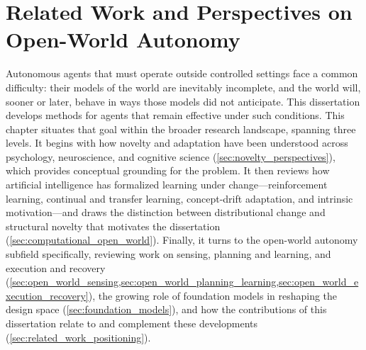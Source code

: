 %
%

\chapter{Related Work and Perspectives on Open-World Autonomy}
\label{ch:related_work}

Autonomous agents that must operate outside controlled settings face a common difficulty: their models of the world are inevitably incomplete, and the world will, sooner or later, behave in ways those models did not anticipate. This dissertation develops methods for agents that remain effective under such conditions. This chapter situates that goal within the broader research landscape, spanning three levels. It begins with how novelty and adaptation have been understood across psychology, neuroscience, and cognitive science (\cref{sec:novelty_perspectives}), which provides conceptual grounding for the problem. It then reviews how artificial intelligence has formalized learning under change---reinforcement learning, continual and transfer learning, concept-drift adaptation, and intrinsic motivation---and draws the distinction between distributional change and structural novelty that motivates the dissertation (\cref{sec:computational_open_world}). Finally, it turns to the open-world autonomy subfield specifically, reviewing work on sensing, planning and learning, and execution and recovery (\cref{sec:open_world_sensing,sec:open_world_planning_learning,sec:open_world_execution_recovery}), the growing role of foundation models in reshaping the design space (\cref{sec:foundation_models}), and how the contributions of this dissertation relate to and complement these developments (\cref{sec:related_work_positioning}).

